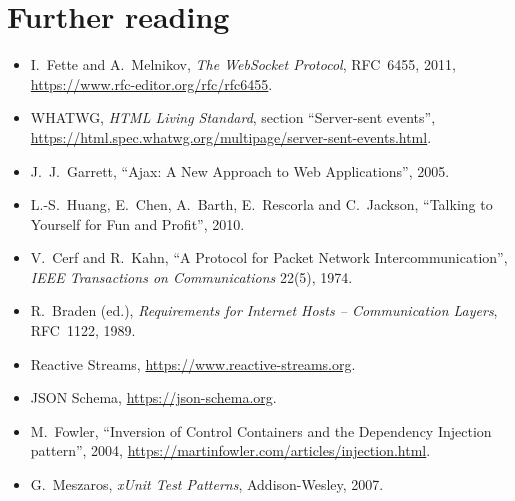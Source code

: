 \section*{Further reading}

\begin{itemize}
  \item I.\ Fette and A.\ Melnikov, \emph{The WebSocket Protocol}, RFC~6455,
        2011, \url{https://www.rfc-editor.org/rfc/rfc6455}.
  \item WHATWG, \emph{HTML Living Standard}, section ``Server-sent events'',
        \url{https://html.spec.whatwg.org/multipage/server-sent-events.html}.
  \item J.~J.\ Garrett, ``Ajax: A New Approach to Web Applications'', 2005.
  \item L.-S.\ Huang, E.\ Chen, A.\ Barth, E.\ Rescorla and C.\ Jackson,
        ``Talking to Yourself for Fun and Profit'', 2010.
  \item V.\ Cerf and R.\ Kahn, ``A Protocol for Packet Network
        Intercommunication'', \emph{IEEE Transactions on Communications} 22(5),
        1974.
  \item R.\ Braden (ed.), \emph{Requirements for Internet Hosts --
        Communication Layers}, RFC~1122, 1989.
  \item Reactive Streams, \url{https://www.reactive-streams.org}.
  \item JSON Schema, \url{https://json-schema.org}.
  \item M.\ Fowler, ``Inversion of Control Containers and the Dependency
        Injection pattern'', 2004,
        \url{https://martinfowler.com/articles/injection.html}.
  \item G.\ Meszaros, \emph{xUnit Test Patterns}, Addison-Wesley, 2007.
\end{itemize}
